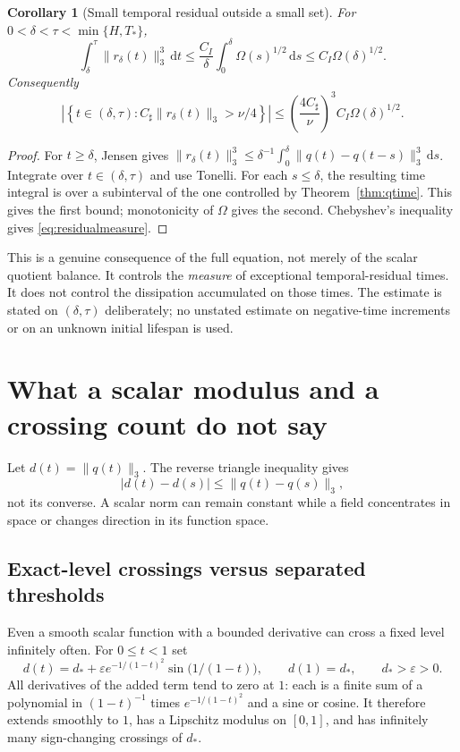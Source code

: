 \documentclass[11pt,a4paper]{article}
\newtheorem{corollary}[theorem]{Corollary}
\theoremstyle{definition}\newtheorem{definition}[theorem]{Definition}
\theoremstyle{remark}\newtheorem{remark}[theorem]{Remark}
\newcommand{\dd}{\,\mathrm d}
\newcommand{\norm}[1]{\lVert #1\rVert}
\numberwithin{equation}{section}
\begin{document}
\begin{corollary}[Small temporal residual outside a small set]\label{cor:residualmeasure}
For $0<\delta<\tau<\min\{H,T_*\}$,
\begin{equation}\label{eq:residualintegrated}
 \int_\delta^\tau\norm{r_\delta(t)}_3^3\dd t
 \le\frac{C_I}{\delta}\int_0^\delta\Omega(s)^{1/2}\dd s
 \le C_I\Omega(\delta)^{1/2}.
\end{equation}
Consequently
\begin{equation}\label{eq:residualmeasure}
 \left|\left\{t\in(\delta,\tau):
       C_\sharp\norm{r_\delta(t)}_3>\nu/4\right\}\right|
 \le\left(\frac{4C_\sharp}{\nu}\right)^3C_I\Omega(\delta)^{1/2}.
\end{equation}
\end{corollary}
\begin{proof}
For $t\ge\delta$, Jensen gives
$\norm{r_\delta(t)}_3^3\le\delta^{-1}\int_0^\delta
\norm{q(t)-q(t-s)}_3^3\dd s$.
Integrate over $t\in(\delta,\tau)$ and use Tonelli. For each $s\le\delta$, the resulting time integral is over a subinterval of the one controlled by Theorem~\ref{thm:qtime}. This gives the first bound; monotonicity of $\Omega$ gives the second. Chebyshev's inequality gives \eqref{eq:residualmeasure}.
\end{proof}
This is a genuine consequence of the full equation, not merely of the scalar quotient balance. It controls the \emph{measure} of exceptional temporal-residual times. It does not control the dissipation accumulated on those times. The estimate is stated on $(\delta,\tau)$ deliberately; no unstated estimate on negative-time increments or on an unknown initial lifespan is used.

\section{What a scalar modulus and a crossing count do not say}
\label{sec:crossing}
Let $d(t)=\norm{q(t)}_3$. The reverse triangle inequality gives
\begin{equation}\label{eq:scalarvector}
 |d(t)-d(s)|\le\norm{q(t)-q(s)}_3,
\end{equation}
not its converse. A scalar norm can remain constant while a field concentrates in space or changes direction in its function space.

\subsection{Exact-level crossings versus separated thresholds}
Even a smooth scalar function with a bounded derivative can cross a fixed level infinitely often. For $0\le t<1$ set
\[
 d(t)=d_*+\varepsilon e^{-1/(1-t)^2}\sin\bigl(1/(1-t)\bigr),
 \qquad d(1)=d_*,\qquad d_*>\varepsilon>0.
\]
All derivatives of the added term tend to zero at $1$: each is a finite sum of a polynomial in $(1-t)^{-1}$ times $e^{-1/(1-t)^2}$ and a sine or cosine. It therefore extends smoothly to $1$, has a Lipschitz modulus on $[0,1]$, and has infinitely many sign-changing crossings of $d_*$.
\end{document}
